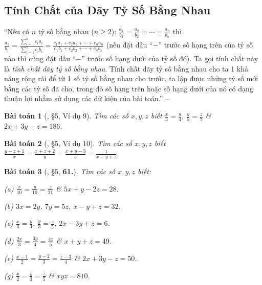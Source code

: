 \documentclass{article}
\numberwithin{equation}{section}
\newtheorem{baitoan}{Bài toán}
\begin{document}
\subsection{Tính Chất của Dãy Tỷ Số Bằng Nhau}
``Nếu có $n$ tỷ số bằng nhau ($n\ge 2$): $\frac{a_1}{b_1} = \frac{a_2}{b_2} = \cdots = \frac{a_n}{b_n}$ thì $\frac{a_1}{b_1} = \frac{\sum_{i=1}^n c_ia_i}{\sum_{i=1}^n c_ib_i} = \frac{c_1a_1 + c_2a_2 + \cdots + c_na_n}{c_1b_1 + c_2b_2 + \cdots + c_nb_n}$ (nếu đặt dấu ``$-$'' trước số hạng trên của tỷ số nào thì cũng đặt dấu ``$-$'' trước số hạng dưới của tỷ số đó). Ta gọi tính chất này là \textit{tính chất dãy tỷ số bằng nhau}. Tính chất dãy tỷ số bằng nhau cho ta 1 khả năng rộng rãi để từ 1 số tỷ số bằng nhau cho trước, ta lập được những tỷ số mới bằng các tỷ số đã cho, trong đó số hạng trên hoặc số hạng dưới của nó có dạng thuận lợi nhằm sử dụng các dữ kiện của bài toán.'' -- \cite[\S5]{Binh_Toan_7_tap_1}

\begin{baitoan}[\cite{Binh_Toan_7_tap_1}, \S5, Ví dụ 9]
	Tìm các số $x,y,z$ biết $\frac{x}{3} = \frac{y}{4}$, $\frac{y}{5} = \frac{z}{7}$ \& $2x + 3y - z = 186$.
\end{baitoan}

\begin{baitoan}[\cite{Binh_Toan_7_tap_1}, \S5, Ví dụ 10]
	Tìm các số $x,y,z$ biết $\frac{y + z + 1}{x} = \frac{x + z + 2}{y} = \frac{x + y - 3}{z} = \frac{1}{x + y + z}$.
\end{baitoan}

\begin{baitoan}[\cite{Binh_Toan_7_tap_1}, \S5, \textbf{61.}]
	Tìm các số $x,y,z$ biết:
	\begin{enumerate*}
		\item[(a)] $\frac{x}{10} = \frac{y}{10} = \frac{z}{21}$ \& $5x + y - 2z = 28$.
		\item[(b)] $3x = 2y$, $7y = 5z$, $x - y + z = 32$.
		\item[(c)] $\frac{x}{3} = \frac{y}{4}$, $\frac{y}{3} = \frac{z}{5}$, $2x - 3y + z = 6$.
		\item[(d)] $\frac{2x}{3} = \frac{3y}{4} = \frac{4z}{5}$ \& $x + y + z = 49$.
		\item[(e)] $\frac{x - 1}{2} = \frac{y - 2}{3} = \frac{z - 3}{4}$ \& $2x + 3y - z = 50$.
		\item[(g)] $\frac{x}{2} = \frac{y}{3} = \frac{z}{5}$ \& $xyz = 810$.
	\end{enumerate*}
\end{baitoan}
\end{document}
